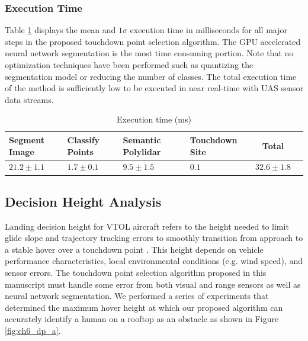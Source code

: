 \subsubsection{Execution Time}

Table \ref{table:execution Time} displays the mean and $1\sigma$ execution time in milliseconds for all major steps in the proposed touchdown point selection algorithm. The GPU accelerated neural network segmentation is the most time consuming portion. Note that no optimization techniques have been performed such as quantizing the segmentation model or reducing the number of classes. The total execution time of the method is sufficiently low to be executed in near real-time with UAS sensor data streams. 


\begin{table}[ht]
\centering
\caption{Execution time (ms)} \label{table:execution Time}
\begin{tabular}{@{}p{1.9cm}p{1.9cm}p{1.9cm}p{1.9cm}cc@{}}
\toprule
Segment Image  & Classify Points & Semantic Polylidar  & Touchdown Site & Total\\ \midrule
$21.2 \pm 1.1$& $1.7 \pm 0.1$   & $9.5 \pm 1.5$   & $0.1$ & $32.6 \pm 1.8$      \\ \bottomrule
\end{tabular}

\end{table}


\subsection{Decision Height Analysis}

Landing decision height for VTOL aircraft refers to the height needed to limit glide slope and trajectory tracking errors to smoothly transition from approach to a stable hover over a touchdown point \cite{hoh_decision-height_1991}.  This height depends on vehicle performance characteristics, local environmental conditions (e.g. wind speed), and sensor errors. The touchdown point selection algorithm proposed in this manuscript must handle some error from both visual and range sensors as well as neural network segmentation.  We performed a series of experiments that determined the maximum hover height at which our proposed algorithm can accurately identify a human on a rooftop as an obstacle as shown in Figure \ref{fig:ch6_dp_a}.

